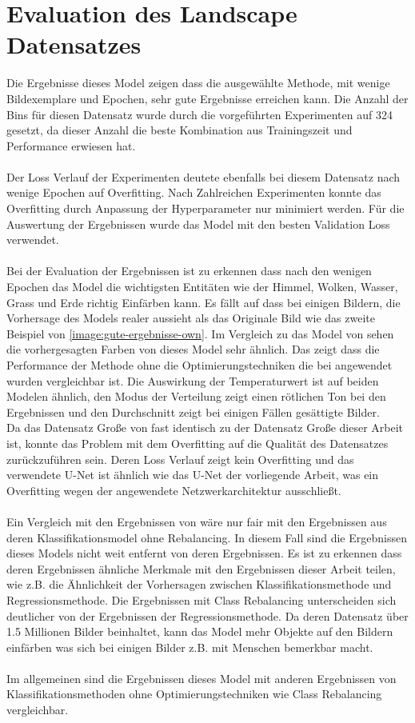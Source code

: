 \section{Evaluation des Landscape Datensatzes}
Die Ergebnisse dieses Model zeigen dass die ausgewählte Methode, mit wenige Bildexemplare und Epochen, sehr gute Ergebnisse erreichen kann.
Die Anzahl der Bins für diesen Datensatz wurde durch die vorgeführten Experimenten auf 324 gesetzt, da dieser Anzahl die beste Kombination
aus Trainingszeit und Performance erwiesen hat.
\\
\\
Der Loss Verlauf der Experimenten deutete ebenfalls bei diesem Datensatz nach wenige Epochen auf Overfitting. Nach Zahlreichen Experimenten
konnte das Overfitting durch Anpassung der Hyperparameter nur minimiert werden. Für die Auswertung der Ergebnissen wurde das Model mit den besten
Validation Loss verwendet.
\\
\\
Bei der Evaluation der Ergebnissen ist zu erkennen dass nach den wenigen Epochen das Model die wichtigsten Entitäten wie der Himmel, Wolken, Wasser,
Grass und Erde richtig Einfärben kann. Es fällt auf dass bei einigen Bildern, die Vorhersage des Models realer aussieht als das Originale Bild
wie das zweite Beispiel von \ref{image:gute-ergebnisse-own}. Im Vergleich zu das Model von \cite{billaut2018colorunet} sehen die vorhergesagten 
Farben von dieses Model sehr ähnlich. Das zeigt dass die Performance der Methode ohne die Optimierungstechniken die bei \cite{billaut2018colorunet}
angewendet wurden vergleichbar ist. Die Auswirkung der Temperaturwert ist auf beiden Modelen ähnlich, den Modus der Verteilung zeigt einen rötlichen Ton bei den
Ergebnissen und den Durchschnitt zeigt bei einigen Fällen gesättigte Bilder.
\\
Da das Datensatz Große von \cite{billaut2018colorunet} fast identisch zu der Datensatz Große dieser Arbeit ist, konnte das Problem mit dem Overfitting
auf die Qualität des Datensatzes zurückzuführen sein. Deren Loss Verlauf zeigt kein Overfitting und das verwendete U-Net ist ähnlich wie das
U-Net der vorliegende Arbeit, was ein Overfitting wegen der angewendete Netzwerkarchitektur ausschließt.
\\
\\
Ein Vergleich mit den Ergebnissen von \cite{zhang2016colorful} wäre nur fair mit den Ergebnissen aus deren Klassifikationsmodel ohne Rebalancing.
In diesem Fall sind die Ergebnissen dieses Models nicht weit entfernt von deren Ergebnissen. Es ist zu erkennen dass deren Ergebnissen ähnliche
Merkmale mit den Ergebnissen dieser Arbeit teilen, wie z.B. die Ähnlichkeit der Vorhersagen zwischen Klassifikationsmethode und Regressionsmethode.
Die Ergebnissen mit Class Rebalancing unterscheiden sich deutlicher von der Ergebnissen der Regressionsmethode. 
Da deren Datensatz über 1.5 Millionen Bilder beinhaltet, kann das Model mehr Objekte auf den
Bildern einfärben was sich bei einigen Bilder z.B. mit Menschen bemerkbar macht. 
\\
\\
Im allgemeinen sind die Ergebnissen dieses Model mit anderen Ergebnissen von Klassifikationsmethoden ohne Optimierungstechniken wie Class Rebalancing
vergleichbar.


